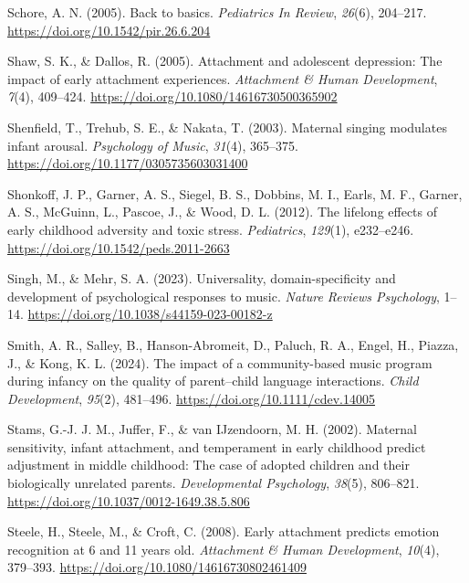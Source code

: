 \documentclass[
]{article}
\newlength{\cslhangindent}
\newenvironment{CSLReferences}[2] %
 {\begin{list}{}{%
  \setlength{\itemindent}{0pt}
  \setlength{\leftmargin}{0pt}
  \setlength{\parsep}{0pt}
  \ifodd #1
   \setlength{\leftmargin}{\cslhangindent}
   \setlength{\itemindent}{-1\cslhangindent}
  \fi
  \setlength{\itemsep}{#2\baselineskip}}}
 {\end{list}}
\begin{document}
\begin{CSLReferences}{1}{0}
Schore, A. N. (2005). Back to basics. \emph{Pediatrics In Review},
\emph{26}(6), 204--217. \url{https://doi.org/10.1542/pir.26.6.204}

Shaw, S. K., \& Dallos, R. (2005). Attachment and adolescent depression:
{The} impact of early attachment experiences. \emph{Attachment \& Human
Development}, \emph{7}(4), 409--424.
\url{https://doi.org/10.1080/14616730500365902}

Shenfield, T., Trehub, S. E., \& Nakata, T. (2003). Maternal singing
modulates infant arousal. \emph{Psychology of Music}, \emph{31}(4),
365--375. \url{https://doi.org/10.1177/0305735603031400}

Shonkoff, J. P., Garner, A. S., Siegel, B. S., Dobbins, M. I., Earls, M.
F., Garner, A. S., McGuinn, L., Pascoe, J., \& Wood, D. L. (2012). The
lifelong effects of early childhood adversity and toxic stress.
\emph{Pediatrics}, \emph{129}(1), e232--e246.
\url{https://doi.org/10.1542/peds.2011-2663}

Singh, M., \& Mehr, S. A. (2023). Universality, domain-specificity and
development of psychological responses to music. \emph{Nature Reviews
Psychology}, 1--14. \url{https://doi.org/10.1038/s44159-023-00182-z}

Smith, A. R., Salley, B., Hanson-Abromeit, D., Paluch, R. A., Engel, H.,
Piazza, J., \& Kong, K. L. (2024). The impact of a community-based music
program during infancy on the quality of parent--child language
interactions. \emph{Child Development}, \emph{95}(2), 481--496.
\url{https://doi.org/10.1111/cdev.14005}

Stams, G.-J. J. M., Juffer, F., \& van IJzendoorn, M. H. (2002).
Maternal sensitivity, infant attachment, and temperament in early
childhood predict adjustment in middle childhood: {The} case of adopted
children and their biologically unrelated parents. \emph{Developmental
Psychology}, \emph{38}(5), 806--821.
\url{https://doi.org/10.1037/0012-1649.38.5.806}

Steele, H., Steele, M., \& Croft, C. (2008). Early attachment predicts
emotion recognition at 6 and 11 years old. \emph{Attachment \& Human
Development}, \emph{10}(4), 379--393.
\url{https://doi.org/10.1080/14616730802461409}


\end{CSLReferences}
\end{document}
